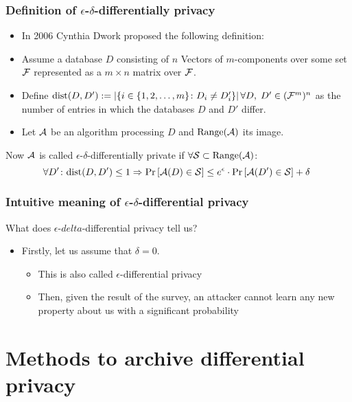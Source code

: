 \documentclass[xcolor=dvipsnames]{beamer}
\newcommand{\itm}{\pause\item}
\begin{document}
      \begin{frame} %
        \frametitle{Definition of $\epsilon$-$\delta$-differentially privacy}
       \begin{itemize}
         \itm In 2006 Cynthia Dwork proposed the following definition:
         \itm Assume a database $D$ consisting of $n$ Vectors of $m$-components over some set $\mathcal{F}$ represented as a $m\times n$ matrix over $\mathcal{F}$. 
         \itm Define $\dist{D}{D'}:=\card{\{i\in\upto{m}\st D_i\neq D_i'\}}\linebreak \forall D,\; D'\in (\Set{F}^m)^n$ as the number of entries in which the databases $D$ and $D'$ differ. %
         \itm Let $\mathcal{A}$ be an algorithm processing $D$ and $\mathrm{Range}(\mathcal{A})$ its image. 
       \end{itemize}
       \pause \begin{defn}
       	 \label{defn:diff-privacy}
       	 Now $\mathcal{A}$ is called $\epsilon$-$\delta$-differentially private if $\forall \mathcal{S}\subset \mathrm{Range}(\mathcal{A})$:
       	 $$\forall D'\st \dist{D}{D'}\leq 1\Rightarrow\Pr\left[\Set{A}(D)\in\Set{S}\right]\leq e^{\epsilon}\cdot \Pr\left[\Set{A}(D')\in\Set{S}\right]+\delta\ $$
       \end{defn}
      \end{frame}
      \begin{frame} %
      	\frametitle{Intuitive meaning of $\epsilon$-$\delta$-differential privacy}
      	What does $\epsilon$-$delta$-differential privacy tell us?
      	\begin{itemize}
      	  \itm Firstly, let us assume that $\delta=0$.
      	  \begin{itemize}
      	  	\itm[$\hookrightarrow$] This is also called $\epsilon$-differential privacy
      	  	\itm[$\hookrightarrow$] Then, given the result of the survey, an attacker cannot learn any new property about us with a significant probability 
      	  \end{itemize}  	
      	\end{itemize}
      \end{frame}

  \section{Methods to archive differential privacy}
\end{document}
